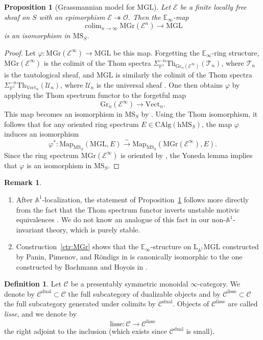 \documentclass{amsart}
\numberwithin{equation}{section}
\theoremstyle{plain}
\newtheorem{proposition}[equation]{Proposition}
\theoremstyle{definition}
\newtheorem{definition}[equation]{Definition}
\newtheorem{remark}[equation]{Remark}
\let\scr=\mathcal
\let\bb=\mathbb
\def\A{\bb A}
\def\P{\bb P}
\def\h{\mathrm h}
\def\L{\mathrm{L}{}}
\let\onto=\twoheadrightarrow
\def\simto{\xrightarrow{\sim}}
\def\Map{\mathrm{Map}}
\def\Th{\mathrm{Th}}
\def\E{\mathbb{E}}
\let\cat=\mathrm
\def\Gr{\mathrm{Gr}{}}
\def\MGL{\mathrm{MGL}}
\def\MGr{\mathrm{MGr}}
\def\Vect{\cat{V}\mathrm{ect}{}}
\def\MS{\mathrm{MS}}
\def\CAlg{\mathrm{CAlg}{}}
\def\lisse{\mathrm{lisse}}
\def\dual{\mathrm{dual}}
\DeclareMathOperator*{\colim}{colim}
\let\phi=\varphi
\begin{document}
\begin{proposition}[Grassmannian model for $\MGL$]
	\label{prop:MGr}
	Let $\scr E$ be a finite locally free sheaf on $S$ with an epimorphism $\scr E\onto\scr O$. Then the $\E_\infty$-map 
	\[
	\colim_{n\to\infty}\MGr(\scr E^n)\to\MGL
	\] 
	is an isomorphism in $\MS_S$.
\end{proposition}

\begin{proof}
	Let $\phi\colon \MGr(\scr E^\infty)\to\MGL$ be this map. 
	Forgetting the $\E_\infty$-ring structure, $\MGr(\scr E^\infty)$ is the colimit of the Thom spectra $\Sigma_{\P^1}^{-n}\Th_{\Gr_n(\scr E^\infty)}(\scr T_n)$, where $\scr T_n$ is the tautological sheaf, and $\MGL$ is similarly the colimit of the Thom spectra $\Sigma_{\P^1}^{-n}\Th_{\Vect_n}(\scr U_n)$, where $\scr U_n$ is the universal sheaf \cite[Proposition 7.1]{AHI}.
	One then obtains $\phi$ by applying the Thom spectrum functor to the forgetful map
	\[
	\Gr_n(\scr E^\infty) \to \Vect_n.
	\]
	This map becomes an isomorphism in $\MS_S$ by \cite[Theorem 5.3]{AHI}. Using the Thom isomorphism, it follows that for any oriented ring spectrum $E\in\CAlg(\h\MS_S)$, the map $\phi$ induces an isomorphism
	\[
	\phi^*\colon \Map_{\MS_S}(\MGL,E) \simto \Map_{\MS_S}(\MGr(\scr E^\infty),E).
	\]
	Since the ring spectrum $\MGr(\scr E^\infty)$ is oriented by \cite[Remark 6.10]{AHI}, the Yoneda lemma implies that $\phi$ is an isomorphism in $\MS_S$.
\end{proof}

\begin{remark}
	\leavevmode
	\begin{enumerate}
		\item After $\A^1$-localization, the statement of Proposition~\ref{prop:MGr} follows more directly from the fact that the Thom spectrum functor inverts unstable motivic equivalences \cite[Remark 16.11]{norms}. We do not know an analogue of this fact in our non-$\A^1$-invariant theory, which is purely stable.
		\item Construction~\ref{ctr:MGr} shows that the $\E_\infty$-structure on $\L_{\A^1}\MGL$ constructed by Panin, Pimenov, and Röndigs in \cite[Section 2.1]{Panin:2008} is canonically isomorphic to the one constructed by Bachmann and Hoyois in \cite[Section 16]{norms}.
	\end{enumerate}
\end{remark}

\begin{definition}
	Let $\scr C$ be a presentably symmetric monoidal $\infty$-category. 
	We denote by $\scr C^\dual\subset\scr C$ the full subcategory of dualizable objects and by $\scr C^\lisse\subset\scr C$ the full subcategory generated under colimits by $\scr C^\dual$. Objects of $\scr C^\lisse$ are called \emph{lisse}, and we denote by
	\[
	\lisse\colon \scr C\to\scr C^\lisse
	\]
	the right adjoint to the inclusion (which exists since $\scr C^\dual$ is small).
\end{definition}
\end{document}
